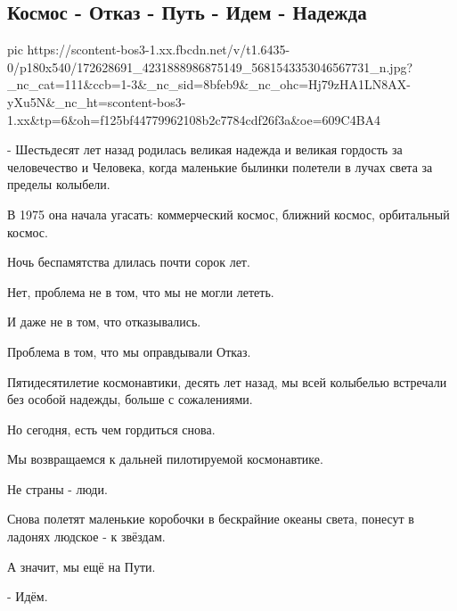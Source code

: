  
 
 
 
 
\subsection{Космос - Отказ - Путь - Идем - Надежда}

\ifcmt
  pic https://scontent-bos3-1.xx.fbcdn.net/v/t1.6435-0/p180x540/172628691_4231888986875149_5681543353046567731_n.jpg?_nc_cat=111&ccb=1-3&_nc_sid=8bfeb9&_nc_ohc=Hj79zHA1LN8AX-yXu5N&_nc_ht=scontent-bos3-1.xx&tp=6&oh=f125bf44779962108b2c7784cdf26f3a&oe=609C4BA4
\fi

- Шестьдесят лет назад родилась великая надежда и великая гордость за
человечество и Человека, когда маленькие былинки полетели в лучах света за
пределы колыбели.

В 1975 она начала угасать: коммерческий космос, ближний космос, орбитальный
космос.

Ночь беспамятства длилась почти сорок лет.

Нет, проблема не в том, что мы не могли лететь. 

И даже не в том, что отказывались.

Проблема в том, что мы оправдывали Отказ. 

Пятидесятилетие космонавтики, десять лет назад, мы всей колыбелью встречали без
особой надежды, больше с сожалениями.

Но сегодня, есть чем гордиться снова.

Мы возвращаемся к дальней пилотируемой космонавтике.

Не страны - люди.

Снова полетят маленькие коробочки в бескрайние океаны света, понесут в ладонях
людское - к звёздам.

А значит, мы ещё на Пути.

- Идём.
